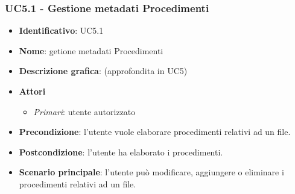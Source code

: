 
\subsubsection{UC5.1 - Gestione metadati Procedimenti}
\begin{itemize}
  \item \textbf{Identificativo}: UC5.1
  \item \textbf{Nome}: getione metadati Procedimenti
  \item \textbf{Descrizione grafica}: (approfondita in UC5)
  \item \textbf{Attori}
        \begin{itemize}
          \item \textit{Primari}: utente autorizzato
        \end{itemize}
  \item \textbf{Precondizione}: l'utente vuole elaborare procedimenti relativi ad un file.
  \item \textbf{Postcondizione}: l'utente ha elaborato i procedimenti.
  \item \textbf{Scenario principale}: l'utente può modificare, aggiungere o eliminare i procedimenti relativi ad un file.
\end{itemize}

